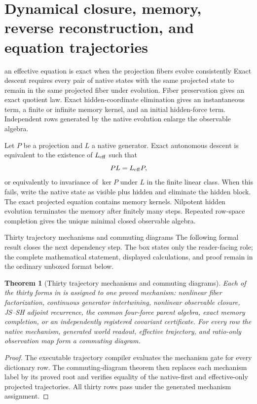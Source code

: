 \documentclass[11pt]{article}
\numberwithin{equation}{section}
\newtheorem{theorem}[definition]{Theorem}
\theoremstyle{remark}
\begin{document}
\section{Dynamical closure, memory, reverse reconstruction, and equation trajectories}
\label{sec:dynamicalcompiler}
\begin{conceptledger}{an effective equation is exact when the projection fibers evolve consistently}
Exact descent requires every pair of native states with the same projected state to remain in the same projected fiber under evolution. Fiber preservation gives an exact quotient law. Exact hidden-coordinate elimination gives an instantaneous term, a finite or infinite memory kernel, and an initial hidden-force term. Independent rows generated by the native evolution enlarge the observable algebra.
\end{conceptledger}
Let $P$ be a projection and $L$ a native generator. Exact autonomous descent is equivalent to the existence of $L_{\rm eff}$ such that
\begin{equation}
 PL=L_{\rm eff}P,
\end{equation}
or equivalently to invariance of $\ker P$ under $L$ in the finite linear class. When this fails, write the native state as visible plus hidden and eliminate the hidden block. The exact projected equation contains memory kernels. Nilpotent hidden evolution terminates the memory after finitely many steps. Repeated row-space completion gives the unique minimal closed observable algebra.

\begin{proofguide}{Thirty trajectory mechanisms and commuting diagrams}
The following formal result closes the next dependency step. The box states only the reader-facing role; the complete mathematical statement, displayed calculations, and proof remain in the ordinary unboxed format below.
\end{proofguide}
\begin{theorem}[Thirty trajectory mechanisms and commuting diagrams]
Each of the thirty forms in  is assigned to one proved mechanism: nonlinear fiber factorization, continuous generator intertwining, nonlinear observable closure, JS--SH adjoint recurrence, the common four-force parent algebra, exact memory completion, or an independently registered covariant certificate. For every row the native mechanism, generated world readout, effective trajectory, and ratio-only observation map form a commuting diagram.
\end{theorem}
\begin{proof}
The executable trajectory compiler evaluates the mechanism gate for every dictionary row. The commuting-diagram theorem then replaces each mechanism label by its proved root and verifies equality of the native-first and effective-only projected trajectories. All thirty rows pass under the generated mechanism assignment.
\end{proof}
\end{document}
